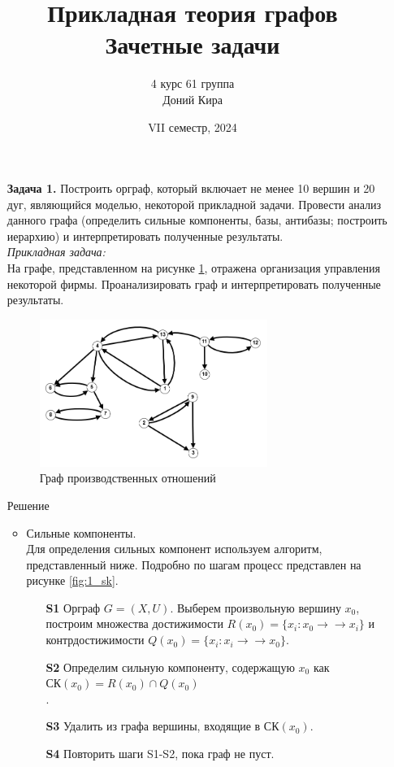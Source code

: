 \documentclass{article}
\title{Прикладная теория графов\\Зачетные задачи}
\author{4 курс 61 группа\\Доний Кира}
\date{VII семестр, 2024}
\begin{document}
\maketitle

\clearpage%
\begin{enumerate} 
\item[\textbf{Задача 1.}] Построить орграф, который включает не менее 10 вершин и 20 дуг, являющийся моделью, некоторой прикладной задачи. Провести анализ данного графа (определить сильные компоненты, базы, антибазы; построить иерархию) и интерпретировать полученные результаты.
\\
\textit{Прикладная задача:}\\
На графе, представленном на рисунке \ref{fig:1_graph}, отражена организация управления некоторой фирмы. Проанализировать граф и интерпретировать полученные результаты.
\begin{figure}[h]
    \includegraphics[width=0.7\textwidth, center]{attachments/1/0.png}
    \caption{Граф производственных отношений}
    \label{fig:1_graph}
\end{figure}
\begin{center}
Решение 
\end{center}

\begin{itemize}
    \item Сильные компоненты.\\
    Для определения сильных компонент используем алгоритм, представленный ниже.
    Подробно по шагам процесс представлен на рисунке \ref{fig:1_sk}.
    \begin{enumerate}
        \item[\textbf{S1}] Орграф $G = (X,U)$. Выберем произвольную вершину $x_0$, построим множества достижимости $R(x_0) = \{x_i : x_0 \rightarrow\rightarrow x_i\}$ и контрдостижимости $Q(x_0) = \{x_i : x_i \rightarrow\rightarrow x_0\}$.  \\
        \item[\textbf{S2}] Определим сильную компоненту, содержащую $x_0$ как $\text{СК}(x_0) = R(x_0) \cap Q(x_0)$\\.
        \item[\textbf{S3}] Удалить из графа вершины, входящие в $\text{СК}(x_0)$.\\
        \item[\textbf{S4}] Повторить шаги S1-S2, пока граф не пуст.\\
    \end{enumerate}
  

\end{itemize}
\end{enumerate}
\end{document}
